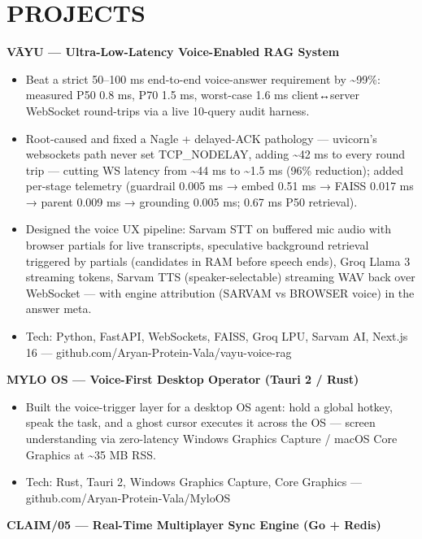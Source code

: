 \documentclass[9pt]{article}
\begin{document}
\section*{PROJECTS}
\textbf{VĀYU  ---  Ultra-Low-Latency Voice-Enabled RAG System}
\vspace{1pt}
\begin{itemize}[leftmargin=11pt,itemsep=0pt,topsep=1pt,parsep=0pt]
\item Beat a strict 50–100 ms end-to-end voice-answer requirement by \textasciitilde{}99\%: measured P50 0.8 ms, P70 1.5 ms, worst-case 1.6 ms client↔server WebSocket round-trips via a live 10-query audit harness.
\item Root-caused and fixed a Nagle + delayed-ACK pathology  ---  uvicorn's websockets path never set TCP\_NODELAY, adding \textasciitilde{}42 ms to every round trip  ---  cutting WS latency from \textasciitilde{}44 ms to \textasciitilde{}1.5 ms (96\% reduction); added per-stage telemetry (guardrail 0.005 ms → embed 0.51 ms → FAISS 0.017 ms → parent 0.009 ms → grounding 0.005 ms; 0.67 ms P50 retrieval).
\item Designed the voice UX pipeline: Sarvam STT on buffered mic audio with browser partials for live transcripts, speculative background retrieval triggered by partials (candidates in RAM before speech ends), Groq Llama 3 streaming tokens, Sarvam TTS (speaker-selectable) streaming WAV back over WebSocket  ---  with engine attribution (SARVAM vs BROWSER voice) in the answer meta.
\item Tech: Python, FastAPI, WebSockets, FAISS, Groq LPU, Sarvam AI, Next.js 16  ---  github.com/Aryan-Protein-Vala/vayu-voice-rag
\end{itemize}
\textbf{MYLO OS  ---  Voice-First Desktop Operator (Tauri 2 / Rust)}
\vspace{1pt}
\begin{itemize}[leftmargin=11pt,itemsep=0pt,topsep=1pt,parsep=0pt]
\item Built the voice-trigger layer for a desktop OS agent: hold a global hotkey, speak the task, and a ghost cursor executes it across the OS  ---  screen understanding via zero-latency Windows Graphics Capture / macOS Core Graphics at \textasciitilde{}35 MB RSS.
\item Tech: Rust, Tauri 2, Windows Graphics Capture, Core Graphics  ---  github.com/Aryan-Protein-Vala/MyloOS
\end{itemize}
\textbf{CLAIM/05  ---  Real-Time Multiplayer Sync Engine (Go + Redis)}
\vspace{1pt}
\end{document}
